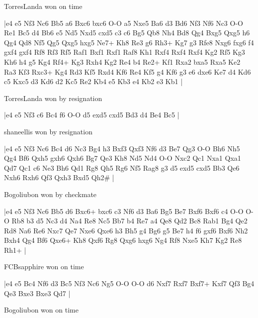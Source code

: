 \showboard

TorresLanda won on time

\makegametitle
|e4 e5 Nf3 Nc6 Bb5 a6 Bxc6 bxc6 O-O a5 Nxe5 Ba6 d3 Bd6 Nf3 Nf6 Nc3 O-O Re1 Bc5 d4 Bb6 e5 Nd5 Nxd5 cxd5 c3 c6 Bg5 Qb8 Nh4 Bd8 Qg4 Bxg5 Qxg5 h6 Qg4 Qd8 Nf5 Qg5 Qxg5 hxg5 Ne7+ Kh8 Re3 g6 Rh3+ Kg7 g3 Rfe8 Nxg6 fxg6 f4 gxf4 gxf4 Rf8 Rf3 Rf5 Raf1 Bxf1 Rxf1 Raf8 Kh1 Rxf4 Rxf4 Rxf4 Kg2 Rf5 Kg3 Kh6 h4 g5 Kg4 Rf4+ Kg3 Rxh4 Kg2 Re4 b4 Re2+ Kf1 Rxa2 bxa5 Rxa5 Ke2 Ra3 Kf3 Rxc3+ Kg4 Rd3 Kf5 Rxd4 Kf6 Re4 Kf5 g4 Kf6 g3 e6 dxe6 Ke7 d4 Kd6 c5 Kxc5 d3 Kd6 d2 Kc5 Re2 Kb4 e5 Kb3 e4 Kb2 e3 Kb1  |

\showboard

TorresLanda won by resignation

\makegametitle
|e4 e5 Nf3 c6 Bc4 f6 O-O d5 exd5 cxd5 Bd3 d4 Be4 Bc5  |

\showboard

shaneellis won by resignation

\makegametitle
|e4 e5 Nf3 Nc6 Bc4 d6 Nc3 Bg4 h3 Bxf3 Qxf3 Nf6 d3 Be7 Qg3 O-O Bh6 Nh5 Qg4 Bf6 Qxh5 gxh6 Qxh6 Bg7 Qe3 Kh8 Nd5 Nd4 O-O Nxc2 Qc1 Nxa1 Qxa1 Qd7 Qc1 c6 Ne3 Bh6 Qd1 Rg8 Qh5 Rg6 Nf5 Rag8 g3 d5 exd5 cxd5 Bb3 Qe6 Nxh6 Rxh6 Qf3 Qxh3 Bxd5 Qh2\#  |

\showboard

Bogoliubon won by checkmate

\makegametitle
|e4 e5 Nf3 Nc6 Bb5 d6 Bxc6+ bxc6 c3 Nf6 d3 Ba6 Bg5 Be7 Bxf6 Bxf6 c4 O-O O-O Rb8 b3 d5 Nc3 d4 Na4 Re8 Nc5 Bb7 b4 Re7 a4 Qe8 Qd2 Bc8 Rab1 Bg4 Qe2 Rd8 Na6 Re6 Nxc7 Qe7 Nxe6 Qxe6 h3 Bh5 g4 Bg6 g5 Be7 h4 f6 gxf6 Bxf6 Nh2 Bxh4 Qg4 Bf6 Qxe6+ Kh8 Qxf6 Rg8 Qxg6 hxg6 Ng4 Rf8 Nxe5 Kh7 Kg2 Re8 Rh1+  |

\showboard

FCBsapphire won on time

\makegametitle
|e4 e5 Bc4 Nf6 d3 Bc5 Nf3 Nc6 Ng5 O-O O-O d6 Nxf7 Rxf7 Bxf7+ Kxf7 Qf3 Bg4 Qe3 Bxe3 Bxe3 Qd7  |

\showboard

Bogoliubon won on time


